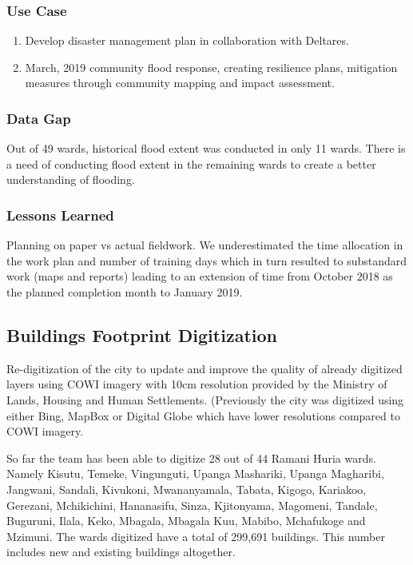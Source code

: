 \documentclass[a4paper,12pt,twoside]{article}
\begin{document}
\subsubsection{Use Case}
\begin{enumerate}
    \item Develop disaster management plan in collaboration with Deltares.
    \item March, 2019 community flood response, creating resilience plans, mitigation measures through community mapping and impact assessment.
\end{enumerate}


\subsubsection{Data Gap}
Out of 49 wards, historical flood extent was conducted in only 11 wards. There is a need of conducting flood extent in the remaining wards to create a better understanding of flooding.

\subsubsection{Lessons Learned}
Planning on paper vs actual fieldwork. We underestimated the time allocation in the work plan and number of training days which in turn resulted to substandard work (maps and reports) leading to an extension of time from October 2018 as the planned completion month to January 2019.

\newpage
\subsection{Buildings Footprint Digitization}
\begin{multicols}{2}
Re-digitization of the city to update and improve the quality of already digitized layers using COWI imagery with 10cm resolution provided by the Ministry of Lands, Housing and Human Settlements. (Previously the city was digitized using either Bing, MapBox or Digital Globe which have lower resolutions compared to COWI imagery. 

So far the team has been able to digitize 28 out of 44 Ramani Huria wards. Namely Kisutu, Temeke, Vingunguti, Upanga Mashariki, Upanga Magharibi, Jangwani, Sandali, Kivukoni, Mwananyamala, Tabata, Kigogo, Kariakoo, Gerezani, Mchikichini, Hananasifu, Sinza, Kjitonyama, Magomeni, Tandale, Buguruni, Ilala, Keko, Mbagala, Mbagala Kuu, Mabibo, Mchafukoge and Mzimuni. The wards digitized have a total of 299,691 buildings. This number includes new and existing buildings altogether.
\end{multicols}
\end{document}
